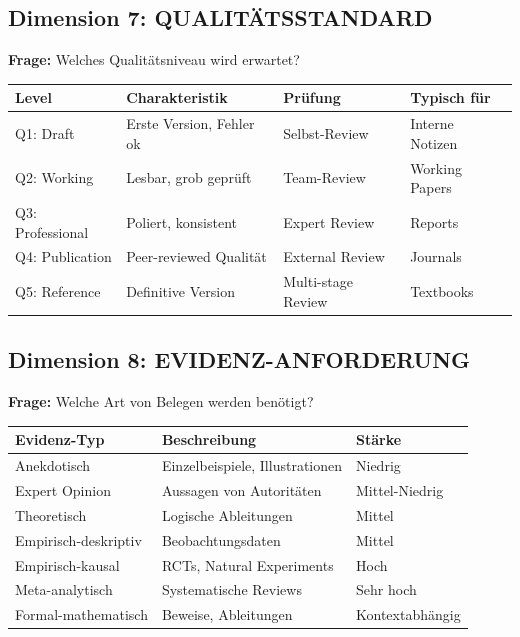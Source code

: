 \documentclass[12pt,a4paper]{article}
\begin{document}
\subsection{Dimension 7: QUALITÄTSSTANDARD}

\textbf{Frage:} Welches Qualitätsniveau wird erwartet?

\begin{table}[htbp]
\centering
\renewcommand{\arraystretch}{1.3}
\begin{tabular}{@{}lp{4cm}p{4cm}l@{}}
\toprule
\textbf{Level} & \textbf{Charakteristik} & \textbf{Prüfung} & \textbf{Typisch für} \\
\midrule
Q1: Draft & Erste Version, Fehler ok & Selbst-Review & Interne Notizen \\
Q2: Working & Lesbar, grob geprüft & Team-Review & Working Papers \\
Q3: Professional & Poliert, konsistent & Expert Review & Reports \\
Q4: Publication & Peer-reviewed Qualität & External Review & Journals \\
Q5: Reference & Definitive Version & Multi-stage Review & Textbooks \\
\bottomrule
\end{tabular}
\end{table}

\subsection{Dimension 8: EVIDENZ-ANFORDERUNG}

\textbf{Frage:} Welche Art von Belegen werden benötigt?

\begin{table}[htbp]
\centering
\renewcommand{\arraystretch}{1.3}
\begin{tabular}{@{}lp{5cm}l@{}}
\toprule
\textbf{Evidenz-Typ} & \textbf{Beschreibung} & \textbf{Stärke} \\
\midrule
Anekdotisch & Einzelbeispiele, Illustrationen & Niedrig \\
Expert Opinion & Aussagen von Autoritäten & Mittel-Niedrig \\
Theoretisch & Logische Ableitungen & Mittel \\
Empirisch-deskriptiv & Beobachtungsdaten & Mittel \\
Empirisch-kausal & RCTs, Natural Experiments & Hoch \\
Meta-analytisch & Systematische Reviews & Sehr hoch \\
Formal-mathematisch & Beweise, Ableitungen & Kontextabhängig \\
\bottomrule
\end{tabular}
\end{table}
\end{document}
